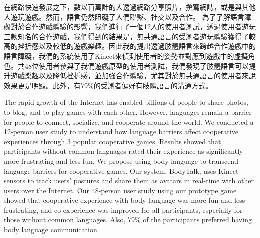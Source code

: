 \begin{abstractzh}
在網路快速發展之下，數以百萬計的人透過網路分享照片，撰寫網誌，或是與其他人遊玩遊戲。然而，語言仍然阻礙了人們聯繫、社交以及合作。
為了了解語言障礙對於合作遊戲體驗的影響，我們進行了一個12人的使用者測試，透過使用者遊玩三款知名的合作遊戲，我們得到的結果是，無共通語言的受測者遊玩體驗獲得了較高的挫折感以及較低的遊戲樂趣。因此我的提出透過肢體語言來跨越合作遊戲中的語言障礙，我們的系統使用了Kinect來偵測使用者的姿勢並對應到遊戲中的虛擬角色。共48位使用者參與了我們遊戲原型的使用者測試，我們發現了肢體語言可以提升遊戲樂趣以及降低挫折感，並加強合作體驗，尤其對於無共通語言的使用者來說效果更是明顯。此外，有79\%的受測者偏好有肢體語言的溝通方式。
\end{abstractzh}

\begin{abstracten}

The rapid growth of the Internet has enabled billions of people to share photos, to blog, and to play games with each other. However, languages remain a barrier for people to connect, socialize, and cooperate around the world. 
We conducted a 12-person user study to understand how language barriers affect cooperative experiences through 3 popular cooperative games. Results showed that participants without common languages rated their experience as significantly more frustrating and less fun. We propose using body language to transcend language barriers for cooperative games. Our system, BodyTalk, uses Kinect sensors to track users' postures and share them as avatars in real-time with other users over the Internet. Our 48-person user study using our prototype game showed that cooperative experience with body language was more fun and less frustrating, and co-experience was improved for all participants, especially for those without common languages. 
Also, 79\% of the participants preferred having body language communication. 

\end{abstracten}

\begin{comment}
\category{I2.10}{Computing Methodologies}{Artificial Intelligence --
Vision and Scene Understanding} \category{H5.3}{Information
Systems}{Information Interfaces and Presentation (HCI) -- Game-based
Interaction.}

\terms{Design, Human factors, Performance.}

\keywords{Cooperative game, Body language, Game design, Communication Pattern, Kinect, Human computer interaction.}
\end{comment}
